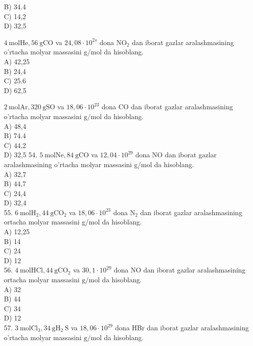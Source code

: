 B) 34.4\\
C) 14,2\\
D) 32,5\\
  \item $4 \mathrm{~mol} \mathrm{He}, 56 \mathrm{~g} \mathrm{CO}$ va $24,08 \cdot 10^{2 s}$ dona $\mathrm{NO}_{2}$ dan iborat gazlar aralashmasining o'rtacha molyar massasini g/mol da hisoblang.\\
A) 42,25\\
B) 24,4\\
C) 25.6\\
D) 62,5
  \item $2 \mathrm{~mol} \mathrm{Ar}, 320 \mathrm{~g} \mathrm{SO}$ va $18,06 \cdot 10^{23}$ dona CO dan iborat gazlar aralashmasining o'rtacha molyar massasini $\mathrm{g} / \mathrm{mol}$ da hisoblang.\\
A) 48,4\\
B) 74.4\\
C) 44,2\\
D) 32,5
54. $5 \mathrm{~mol} \mathrm{Ne}, 84 \mathrm{~g} \mathrm{CO}$ va $12,04 \cdot 10^{29}$ dona NO dan iborat gazlar aralashmasining o'rtacha molyar massasini g/mol da hisoblang.\\
A) 32,7\\
B) 44,7\\
C) 24,4\\
D) 32,4\\
55. $6 \mathrm{~mol} \mathrm{H}_{2}, 44 \mathrm{~g} \mathrm{CO}_{2}$ va $18,06 \cdot 10^{23}$ dona $\mathrm{N}_{2}$ dan iborat gazlar aralashmasining ortacha molyar massasini g/mol da hisoblang.\\
A) 12,25\\
B) 14\\
C) 24\\
D) 12\\
56. $4 \mathrm{~mol} \mathrm{HCl}, 44 \mathrm{~g} \mathrm{CO}_{2}$ va $30,1 \cdot 10^{29}$ dona NO dan iborat gazlar aralashmasining ortacha molyar massasini $\mathrm{g} / \mathrm{mol}$ da hisoblang.\\
A) 32\\
B) 44\\
C) 34\\
D) 12\\
57. $3 \mathrm{~mol} \mathrm{Cl}_{3}, 34 \mathrm{~g} \mathrm{H}_{2} \mathrm{~S}$ va $18,06 \cdot 10^{29}$ dona HBr dan iborat gazlar aralashmasining\\
o'rtacha molyar massasini $\mathrm{g} / \mathrm{mol}$ da hisoblang.\\
